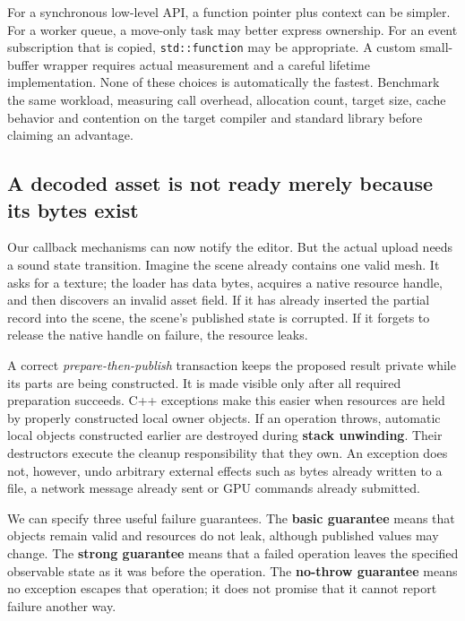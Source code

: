 For a synchronous low-level API, a function pointer plus context can be simpler. For a worker queue, a move-only task may better express ownership. For an event subscription that is copied, \texttt{std::function} may be appropriate. A custom small-buffer wrapper requires actual measurement and a careful lifetime implementation. None of these choices is automatically the fastest. Benchmark the same workload, measuring call overhead, allocation count, target size, cache behavior and contention on the target compiler and standard library before claiming an advantage.

\subsection{A decoded asset is not ready merely because its bytes exist}\label{05-engine-i-ch004-a-decoded-asset-is-not-ready-merely-because-its-bytes-exist}

\hypertarget{05-engine-i-ch004-a-decoded-asset-is-not-ready-merely-because-its-bytes-exist}{}

Our callback mechanisms can now notify the editor. But the actual upload needs a sound state transition. Imagine the scene already contains one valid mesh. It asks for a texture; the loader has data bytes, acquires a native resource handle, and then discovers an invalid asset field. If it has already inserted the partial record into the scene, the scene's published state is corrupted. If it forgets to release the native handle on failure, the resource leaks.

A correct \emph{prepare-then-publish} transaction keeps the proposed result private while its parts are being constructed. It is made visible only after all required preparation succeeds. C++ exceptions make this easier when resources are held by properly constructed local owner objects. If an operation throws, automatic local objects constructed earlier are destroyed during \textbf{stack unwinding}. Their destructors execute the cleanup responsibility that they own. An exception does not, however, undo arbitrary external effects such as bytes already written to a file, a network message already sent or GPU commands already submitted.

We can specify three useful failure guarantees. The \textbf{basic guarantee} means that objects remain valid and resources do not leak, although published values may change. The \textbf{strong guarantee} means that a failed operation leaves the specified observable state as it was before the operation. The \textbf{no-throw guarantee} means no exception escapes that operation; it does not promise that it cannot report failure another way.


